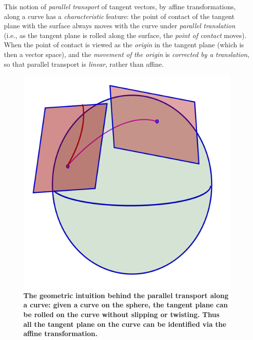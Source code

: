 \documentclass[11pt]{article}
\begin{document}
\begin{enumerate}
This notion of \emph{parallel transport} of tangent vectors, by affine transformations, along a curve has a \emph{characteristic} feature: the point of contact of the tangent plane with the surface always moves with the curve under \emph{parallel translation} (i.e., as the tangent plane is rolled along the surface, the \emph{point of contact} moves). When the point of contact is viewed as the \emph{origin} in the tangent plane (which is then a vector space), and the \emph{movement of the origin} is \emph{corrected by a translation}, so that parallel transport is \emph{linear}, rather than affine.
\begin{figure}[htb]
\centering
\begin{minipage}{0.6\linewidth}
 \centerline{\includegraphics[scale = 0.32]{Parallel_transport_sphere.png}}
\end{minipage}
\caption{\scriptsize
\textbf{The geometric intuition behind the parallel transport along a curve: given a curve on the sphere, the tangent plane can be rolled on the curve without slipping or twisting.  Thus all the tangent plane on the curve can be identified via the affine transformation. }}\label{fig: parallel_transport_sphere}
\end{figure} \vspace{5pt}


\end{enumerate}
\end{document}
